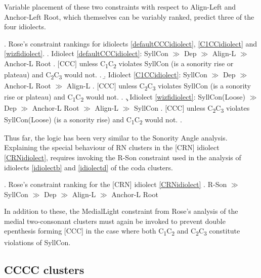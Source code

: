 \documentclass[12pt]{article}
\begin{document}
Variable placement of these two constraints with respect to {\sc Align-Left} and {\sc Anchor-Left Root}, which themselves can be variably ranked, predict three of the four idiolects.

\ex. Rose's constraint rankings for idiolects \ref{defaultCCCidiolect}, \ref{C1CCidiolect} and \ref{wizfidiolect}.
    \a. Idiolect \ref{defaultCCCidiolect}: {\sc SyllCon} $\gg$ {\sc Dep} $\gg$ {\sc Align-L} $\gg$ {\sc Anchor-L Root}
          \a. $[$CCC$]$ unless C\textsubscript{1}C\textsubscript{2} violates {\sc SyllCon}
               (is a sonority rise or plateau) and C\textsubscript{2}C\textsubscript{3} would not.
          \z.
     \b. Idiolect \ref{C1CCidiolect}: {\sc SyllCon} $\gg$ {\sc Dep} $\gg$ {\sc Anchor-L Root} $\gg$ {\sc Align-L} 
          \a.  $[$CCC$]$ unless C\textsubscript{2}C\textsubscript{3} violates {\sc SyllCon}
                (is a sonority rise or plateau) and C\textsubscript{1}C\textsubscript{2} would not.
          \z.
     \c. Idiolect \ref{wizfidiolect}: {\sc SyllCon(Loose)} $\gg$ {\sc Dep} $\gg$ {\sc Anchor-L Root} $\gg$ {\sc Align-L} $\gg$ {\sc SyllCon}
          \a. $[$CCC$]$ unless C\textsubscript{2}C\textsubscript{3} violates {\sc SyllCon(Loose)} 
                (is a sonority rise) and C\textsubscript{1}C\textsubscript{2} would not.
          \z.

Thus far, the logic has been very similar to the {\sc Sonority Angle} analysis. Explaining the special behaviour of RN clusters in the [CRN] idiolect \ref{CRNidiolect}, requires invoking the {\sc *R-Son} constraint used in the analysis of idiolects \ref{idiolectb} and \ref{idiolectd} of the coda clusters.

\ex. Rose's constraint ranking for the [CRN] idiolect \ref{CRNidiolect}
     \a. {\sc *R-Son} $\gg$ {\sc SyllCon} $\gg$ {\sc Dep} $\gg$ {\sc Align-L} $\gg$ {\sc Anchor-L Root}

In addition to these, the {\sc *MedialLight} constraint from Rose's analysis of the medial two-consonant clusters must again be invoked to prevent double epenthesis forming [CCC] in the case where both C\textsubscript{1}C\textsubscript{2} and C\textsubscript{2}C\textsubscript{3} constitute violations of {\sc SyllCon}.


\subsection{CCCC clusters}
\end{document}
